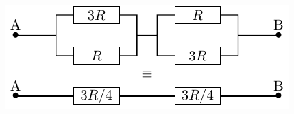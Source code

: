 \documentclass[a4paper, 10pt, garamond, oneside]{book}
\begin{document}
{\begin{enumerate}
		\hfill
		\begin{minipage}[t]{0.4\linewidth}
			~
			\vspace{-20pt}
			\begin{center}
				\includegraphics[width=\linewidth]{diplin_q2}
			\end{center}
		\end{minipage}
	\end{enumerate}
}
\end{document}
